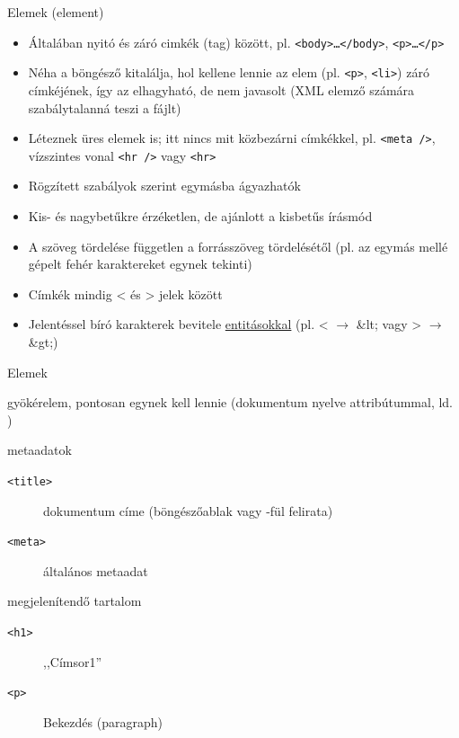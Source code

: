 \documentclass[usenames,dvipsnames,aspectratio=169]{beamer}
\newcommand{\kiemel}[1]{{\color{kiemelesszin}#1}}
\newcommand{\hiv}[1]{{\color{hivatkozasszin}#1}}
\begin{document}
\begin{frame}
  Elemek (element)
  \begin{itemize}
    \item Általában nyitó és záró cimkék (tag) között, pl. \texttt{<body>\dots</body>}, \texttt{<p>\dots</p>}
    \item Néha a böngésző kitalálja, hol kellene lennie az elem (pl. \texttt{<p>}, \texttt{<li>}) záró címkéjének, így az elhagyható, de \kiemel{nem javasolt} (XML elemző számára szabálytalanná teszi a fájlt)
    \item Léteznek üres elemek is; itt nincs mit közbezárni címkékkel, pl. \texttt{<meta />}, vízszintes vonal \texttt{<hr~/>} vagy \texttt{<hr>}
    \item Rögzített szabályok szerint egymásba ágyazhatók
    \item Kis- és nagybetűkre érzéketlen, de \kiemel{ajánlott} a kisbetűs írásmód
    \item A szöveg tördelése független a forrásszöveg tördelésétől (pl. az egymás mellé gépelt fehér karaktereket egynek tekinti)
    \item Címkék mindig \kiemel{<} és \kiemel{>} jelek között
    \item Jelentéssel bíró karakterek bevitele \hiv{\href{https://en.wikipedia.org/wiki/List_of_XML_and_HTML_character_entity_references\#Character_entity_references_in_HTML}{entitásokkal}} (pl. \kiemel{<} $\to$ \kiemel{\&lt;} vagy \kiemel{>} $\to$ \kiemel{\&gt;})
  \end{itemize}
\end{frame}

\begin{frame}
  Elemek
  \begin{description}[m]
    \item[\texttt{<html>}] gyökérelem, pontosan egynek kell lennie (dokumentum nyelve attribútummal, ld. )
    \item[\texttt{<head>}] metaadatok
    \begin{description}
      \item[\texttt{<title>}] dokumentum címe (böngészőablak vagy -fül felirata)
      \item[\texttt{<meta>}] általános metaadat
    \end{description}
    \item[\texttt{<body>}] megjelenítendő tartalom
    \begin{description}
      \item[\texttt{<h1>}] ,,Címsor1''
      \item[\texttt{<p>}] Bekezdés (paragraph)
    \end{description}
  \end{description}
\end{frame}
\end{document}
